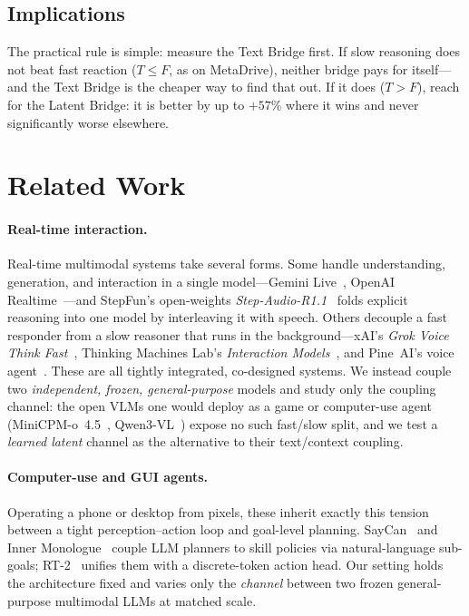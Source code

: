 \documentclass[11pt]{article}
\begin{document}
\subsection{Implications}

The practical rule is simple: measure the Text Bridge first. If slow reasoning does not beat fast reaction ($T\!\le\!F$, as on MetaDrive), neither bridge pays for itself---and the Text Bridge is the cheaper way to find that out. If it does ($T\!>\!F$), reach for the Latent Bridge: it is better by up to $+57\%$ where it wins and never significantly worse elsewhere.

\section{Related Work}
\label{sec:related}

\paragraph{Real-time interaction.} Real-time multimodal systems take several forms. Some handle understanding, generation, and interaction in a single model---Gemini Live~\cite{gemini_live}, OpenAI Realtime~\cite{openai_realtime}---and StepFun's open-weights \emph{Step-Audio-R1.1}~\cite{stepaudior1} folds explicit reasoning into one model by interleaving it with speech. Others decouple a fast responder from a slow reasoner that runs in the background---xAI's \emph{Grok Voice Think Fast}~\cite{grokvoice}, Thinking Machines Lab's \emph{Interaction Models}~\cite{interaction_models}, and Pine~AI's voice agent~\cite{pineai}. These are all tightly integrated, co-designed systems. We instead couple two \emph{independent, frozen, general-purpose} models and study only the coupling channel: the open VLMs one would deploy as a game or computer-use agent (MiniCPM-o~4.5~\cite{minicpmo}, Qwen3-VL~\cite{qwen3vl}) expose no such fast/slow split, and we test a \emph{learned latent} channel as the alternative to their text/context coupling.

\paragraph{Computer-use and GUI agents.} Operating a phone or desktop from pixels, these inherit exactly this tension between a tight perception--action loop and goal-level planning. SayCan~\cite{saycan} and Inner Monologue~\cite{inner_monologue} couple LLM planners to skill policies via natural-language sub-goals; RT-2~\cite{rt2} unifies them with a discrete-token action head. Our setting holds the architecture fixed and varies only the \emph{channel} between two frozen general-purpose multimodal LLMs at matched scale.
\end{document}
